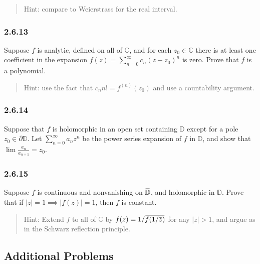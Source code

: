 \begin{quote}
Hint: compare to Weierstrass for the real interval.
\end{quote}

\hypertarget{section-45}{%
\subsubsection{2.6.13}\label{section-45}}

Suppose \(f\) is analytic, defined on all of \({\mathbb{C}}\), and for
each \(z_0 \in {\mathbb{C}}\) there is at least one coefficient in the
expansion \(f(z) = \sum_{n=0}^\infty c_n(z-z_0)^n\) is zero. Prove that
\(f\) is a polynomial.

\begin{quote}
Hint: use the fact that \(c_n n! = f^{(n)}(z_0)\) and use a countability
argument.
\end{quote}

\hypertarget{section-46}{%
\subsubsection{2.6.14}\label{section-46}}

Suppose that \(f\) is holomorphic in an open set containing
\({\mathbb{D}}\) except for a pole \(z_0 \in {{\partial}}{\mathbb{D}}\).
Let \(\sum_{n=0}^\infty a_n z^n\) be the power series expansion of \(f\)
in \({\mathbb{D}}\), and show that \(\lim \frac{a_n}{a_{n+1}} = z_0\).

\hypertarget{section-47}{%
\subsubsection{2.6.15}\label{section-47}}

Suppose \(f\) is continuous and nonvanishing on
\(\mkern 1.5mu\overline{\mkern-1.5mu{\mathbb{D}}\mkern-1.5mu}\mkern 1.5mu\),
and holomorphic in \({\mathbb{D}}\). Prove that if
\({\left\lvert {z} \right\rvert} = 1 \implies {\left\lvert {f(z)} \right\rvert} = 1\),
then \(f\) is constant.

\begin{quote}
Hint: Extend \(f\) to all of \({\mathbb{C}}\) by
\(f(z) = 1/ \mkern 1.5mu\overline{\mkern-1.5muf(1/\mkern 1.5mu\overline{\mkern-1.5muz\mkern-1.5mu}\mkern 1.5mu)\mkern-1.5mu}\mkern 1.5mu\)
for any \({\left\lvert {z} \right\rvert} > 1\), and argue as in the
Schwarz reflection principle.
\end{quote}

\hypertarget{additional-problems}{%
\subsection{Additional Problems}\label{additional-problems}}

